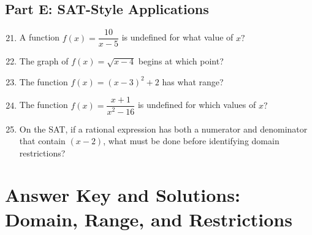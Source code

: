 \documentclass[14pt]{extarticle}
\begin{document}
\subsection*{Part E: SAT-Style Applications}
\begin{enumerate}
  \setcounter{enumi}{20}
  \item A function \(f(x) = \dfrac{10}{x - 5}\) is undefined for what value of \(x?\)
  \item The graph of \(f(x) = \sqrt{x - 4}\) begins at which point?
  \item The function \(f(x) = (x - 3)^2 + 2\) has what range?
  \item The function \(f(x) = \dfrac{x + 1}{x^2 - 16}\) is undefined for which values of \(x?\)
  \item On the SAT, if a rational expression has both a numerator and denominator that contain \((x - 2)\), what must be done before identifying domain restrictions?
\end{enumerate}

\newpage


\section*{Answer Key and Solutions: Domain, Range, and Restrictions}
\end{document}
